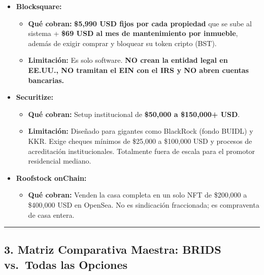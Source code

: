 \documentclass[
]{article}
\providecommand{\tightlist}{%
  \setlength{\itemsep}{0pt}\setlength{\parskip}{0pt}}
\begin{document}
\begin{itemize}
\tightlist
\item
  \textbf{Blocksquare:}

  \begin{itemize}
  \tightlist
  \item
    \textbf{Qué cobran:} \textbf{\$5,990 USD fijos por cada propiedad}
    que se sube al sistema + \textbf{\$69 USD al mes de mantenimiento
    por inmueble}, además de exigir comprar y bloquear su token cripto
    (BST).
  \item
    \textbf{Limitación:} Es solo software. \textbf{NO crean la entidad
    legal en EE.UU., NO tramitan el EIN con el IRS y NO abren cuentas
    bancarias.}
  \end{itemize}
\item
  \textbf{Securitize:}

  \begin{itemize}
  \tightlist
  \item
    \textbf{Qué cobran:} Setup institucional de \textbf{\$50,000 a
    \$150,000+ USD}.
  \item
    \textbf{Limitación:} Diseñado para gigantes como BlackRock (fondo
    BUIDL) y KKR. Exige cheques mínimos de \$25,000 a \$100,000 USD y
    procesos de acreditación institucionales. Totalmente fuera de escala
    para el promotor residencial mediano.
  \end{itemize}
\item
  \textbf{Roofstock onChain:}

  \begin{itemize}
  \tightlist
  \item
    \textbf{Qué cobran:} Venden la casa completa en un solo NFT de
    \$200,000 a \$400,000 USD en OpenSea. No es sindicación fraccionada;
    es compraventa de casa entera.
  \end{itemize}
\end{itemize}

\begin{center}\rule{0.5\linewidth}{0.5pt}\end{center}

\subsection{3. Matriz Comparativa Maestra: BRIDS vs.~Todas las
Opciones}\label{matriz-comparativa-maestra-brids-vs.-todas-las-opciones}
\end{document}
